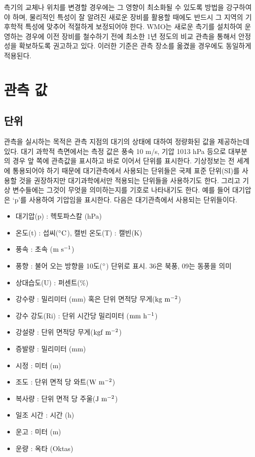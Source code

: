 측기의 교체나 위치를 변경할 경우에는 그 영향이 최소화될 수 있도록 방법을 강구하여야 하며, 물리적인 특성이 잘 알려진 새로운 장비를 활용할 때에도 반드시 그 지역의 기후학적 특성에 맞추어 적절하게 보정되어야 한다. WMO는 새로운 측기를 설치하여 운영하는 경우에 이전 장비를 철수하기 전에 최소한 1년 정도의 비교 관측을 통해서 안정성을 확보하도록 권고하고 있다. 이러한 기준은 관측 장소를 옮겼을 경우에도 동일하게 적용된다. 

\section{관측 값}

\subsection{단위}

관측을 실시하는 목적은 관측 지점의 대기의 상태에 대하여 정량화된 값을 제공하는데 있다. 대기 과학적 측면에서는 측정 값은 풍속 10 m/s, 기압 1013 hPa 등으로 대부분의 경우 앞 쪽에 관측값을 표시하고 바로 이어서 단위를 표시한다.
기상정보는 전 세계에 통용되어야 하기 때문에 대기관측에서 사용되는 단위들은 국제 표준 단위(SI)를 사용할 것을 권장하지만 대기과학에서만 적용되는 단위들을 사용하기도 한다. 그리고 기상 변수들에는 그것이 무엇을 의미하는지를 기호로 나타내기도 한다. 예를 들어 대기압은 ‘p’를 사용하여 기압임을 표시한다. 다음은 대기관측에서 사용되는 단위들이다.

\begin{itemize}
	\item 대기압(p) : 헥토파스칼 (hPa)
	\item 온도(t) : 섭씨($\rm ^{\circ}C$), 캘빈 온도(T) : 캘빈(K)
	\item 풍속 : 초속 ($\rm m~s^{-1}$)
	\item 풍향 : 불어 오는 방향을 10도($\rm ^{\circ}$) 단위로 표시. 36은 북풍, 09는 동풍을 의미
	\item 상대습도(U) : 퍼센트(\%)
	\item 강수량 : 밀리미터 (mm) 혹은 단위 면적당 무게($\rm {kg~m^{-2}}$)
	\item 강수 강도(Ri) : 단위 시간당 밀리미터 ($\rm {mm~h^{-1}}$)
	\item 강설량 : 단위 면적당 무게($\rm {kgf~m^{-2}}$)
	\item 증발량 : 밀리미터 (mm)
	\item 시정 : 미터 (m)
 	\item 조도 : 단위 면적 당 와트($\rm {W~m^{-2}}$)
	\item 복사량 : 단위 면적 당 주울($\rm {J~m^{-2}}$)
	\item 일조 시간 : 시간 (h)
	\item 운고 : 미터 (m)
	\item 운량 : 옥타 (Oktas)
\end{itemize}

